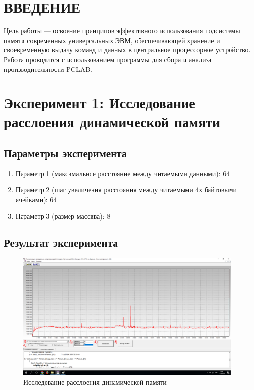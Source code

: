 \documentclass[a4paper,oneside,14pt]{extarticle}
\begin{document}

\setcounter{page}{2}
\renewcommand{\contentsname}{СОДЕРЖАНИЕ}
\tableofcontents

\newpage

\section*{ВВЕДЕНИЕ}

Цель работы --- освоение принципов эффективного использования подсистемы памяти современных универсальных ЭВМ, обеспечивающей хранение и своевременную выдачу команд и данных в центральное процессорное устройство.
Работа проводится с использованием программы для сбора и анализа производительности PCLAB.

\newpage

\section{Эксперимент 1: Исследование расслоения динамической памяти}

\subsection{Параметры эксперимента}

\begin{enumerate}
    \item Параметр 1 (максимальное расстояние между читаемыми данными): 64
    \item Параметр 2 (шаг увеличения расстояния между читаемыми 4х байтовыми ячейками): 64
    \item Параметр 3 (размер массива): 8
\end{enumerate}

\subsection{Результат эксперимента}

\begin{figure}[H]
	\centering
	\includegraphics[width=1\textwidth]{img/1.png}
    \caption{Исследование расслоения динамической памяти}
	\label{fig:1}
\end{figure}
\end{document}
